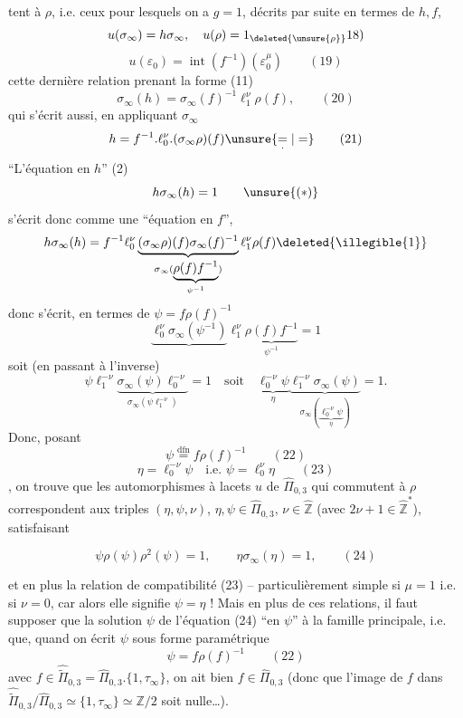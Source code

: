 tent à $\rho$, i.e. ceux pour lesquels on a $g=1$, décrits par suite en termes de $h,f$,
\[
u(\sigma_\infty)=h\sigma_\infty,\quad u(\rho)=1_{\deleted{\unsure{\rho}}}18)
\]
\[
u(\varepsilon_0)=\operatorname{int}(f^{-1})(\varepsilon_0^\mu)
\qquad (19)
\]
cette dernière relation prenant la forme (11)
\[
\sigma_\infty(h)=\sigma_\infty(f)^{-1}\ell_1^\nu\rho(f),
\qquad (20)
\]
qui s'écrit aussi, en appliquant $\sigma_\infty$
\[
h=f^{-1}.\ell_0^\nu.(\sigma_\infty\rho)(f)\unsure{\underset{\cdot}{=}|=}
\qquad (21)
\]
``L'équation en $h$'' (2) 
\[
h\sigma_\infty(h)=1
\qquad \unsure{(*)}
\]
s'écrit donc comme une ``équation en $f$'',  
\[
h\sigma_\infty(h)=f^{-1}\ell_0^\nu
\underbrace{(\sigma_\infty\rho)(f)\sigma_\infty(f)^{-1}}_{\sigma_\infty(\underbrace{\rho(f)f^{-1}}_{\psi^{-1}})}
\ell_1^\nu\rho(f)\deleted{\illegible{1}}
\]
donc  s'écrit, en termes de $\psi=f\rho(f)^{-1}$
\[
\underbrace{\ell_0^\nu\sigma_\infty(\psi^{-1})}\ell_1^\nu
\underbrace{\rho(f)f^{-1}}_{\psi^{-1}}=1
\]
soit (en passant à l'inverse)
\[
\psi\ell_1^{-\nu}\underbrace{\sigma_\infty(\psi)\ell_0^{-\nu}}_{\sigma_\infty(\psi\ell_1^{-\nu})}=1
\quad\text{soit}\quad
\underbrace{\ell_0^{-\nu}\psi}_{\eta}
\underbrace{\ell_1^{-\nu}\sigma_\infty(\psi)}_{\sigma_\infty(\underbrace{\ell_0^{-\nu}\psi}_{\eta})}=1.
\]
Donc, posant
\[
\psi\overset{\mathrm{dfn}}{=}f\rho(f)^{-1}
\qquad (22)
\]
\[
\boxed{\eta=\ell_0^{-\nu}\psi\quad\text{i.e. }\psi=\ell_0^\nu\eta}
\qquad (23)
\]
, on trouve que les automorphismes à lacets $u$ de $\widehat{\Pi}_{0,3}$ qui commutent à $\rho$ correspondent aux triples $(\eta,\psi,\nu)$, $\eta,\psi\in\widehat{\Pi}_{0,3}$, $\nu\in\widehat{\mathbb Z}$ (avec $2\nu+1\in\widehat{\mathbb Z}^{*}$), satisfaisant



\[
\boxed{\psi\rho(\psi)\rho^2(\psi)=1,\qquad\eta\sigma_\infty(\eta)=1},
\qquad (24)
\]

et en plus la relation de compatibilité (23) -- particulièrement simple si $\mu=1$ i.e. si $\nu=0$, car alors elle signifie $\psi=\eta$ ! Mais en plus de ces relations, il faut supposer que la solution $\psi$ de l'équation (24) ``en $\psi$''  à la famille principale, i.e. que, quand on écrit $\psi$ sous forme paramétrique
\[
\psi=f\rho(f)^{-1}
\qquad (22)
\]
avec $f\in\widehat{\widetilde{\Pi}}_{0,3}=\widehat{\Pi}_{0,3}.\{1,\tau_\infty\}$, on ait bien $f\in\widehat{\Pi}_{0,3}$ (donc que l'image de $f$ dans $\widehat{\widetilde{\Pi}}_{0,3}/\widehat{\Pi}_{0,3}\simeq\{1,\tau_\infty\}\simeq\mathbb Z/2$ soit nulle\dots).

